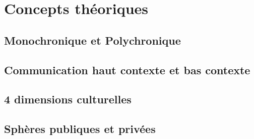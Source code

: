 \part{Concepts théoriques}
\chapter{Monochronique et Polychronique}

\chapter{Communication haut contexte et bas contexte}

\chapter{4 dimensions culturelles}

\chapter{Sphères publiques et privées}